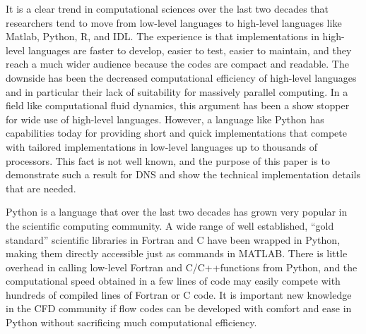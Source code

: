 \documentclass[11pt, oneside]{article}
\begin{document}
It is a clear trend in computational sciences over the last two decades
that researchers tend to move from low-level languages to high-level languages
like Matlab, Python, R, and IDL. The experience is that implementations
in high-level languages are faster to develop, easier to test,
easier to maintain, and they
reach a much wider audience because the codes are compact and readable.
The downside has been the decreased computational
efficiency of high-level languages and in particular their lack of
suitability for massively parallel computing. In a field like computational
fluid dynamics, this argument has been a show stopper for wide use
of high-level languages. However, a language like Python has capabilities
today for providing short and quick implementations that compete with
tailored implementations in low-level languages up to thousands of processors.
This fact is not well known, and the purpose of this paper is to
demonstrate such a result for DNS and show the technical implementation
details that are needed.


Python is a language that over the last two decades has grown very popular in the scientific computing community. A wide range of well established, ``gold standard'' scientific libraries in Fortran and C have been wrapped in Python, making them directly accessible just as commands in MATLAB. There is little overhead in calling low-level Fortran and C/C++functions from Python, and the computational speed obtained in a few lines of code may easily compete with hundreds of compiled lines of Fortran or C code. It is important new knowledge in the CFD community if flow codes can be developed with comfort and ease in Python without sacrificing much computational efficiency.
\end{document}
